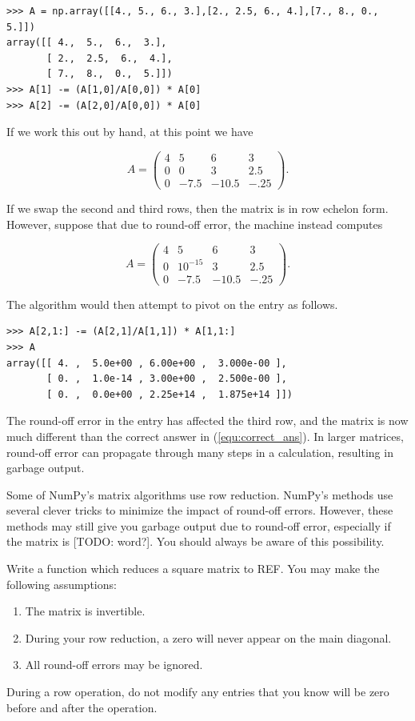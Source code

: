 \begin{lstlisting}
>>> A = np.array([[4., 5., 6., 3.],[2., 2.5, 6., 4.],[7., 8., 0., 5.]])
array([[ 4.,  5.,  6.,  3.],
       [ 2.,  2.5,  6.,  4.],
       [ 7.,  8.,  0.,  5.]])
>>> A[1] -= (A[1,0]/A[0,0]) * A[0]
>>> A[2] -= (A[2,0]/A[0,0]) * A[0]
\end{lstlisting}

If we work this out by hand, at this point we have

\begin{equation}\label{equ:correct_ans}
A = \begin{pmatrix}
4&5&6&3 \\
0&0&3&2.5 \\
0&-7.5&-10.5&-.25
\end{pmatrix}.
\end{equation}

If we swap the second and third rows, then the matrix is in row echelon form. However, suppose that due to round-off error, the machine instead computes

\[
A = \begin{pmatrix}
4&5&6&3 \\
0&10^{-15}&3&2.5 \\
0&-7.5&-10.5&-.25
\end{pmatrix}.
\]

The algorithm would then attempt to pivot on the  entry as follows.

\begin{lstlisting}
>>> A[2,1:] -= (A[2,1]/A[1,1]) * A[1,1:]
>>> A
array([[ 4. ,  5.0e+00 , 6.00e+00 ,  3.000e-00 ],
       [ 0. ,  1.0e-14 , 3.00e+00 ,  2.500e-00 ],
       [ 0. ,  0.0e+00 , 2.25e+14 ,  1.875e+14 ]])
\end{lstlisting}

The round-off error in the  entry has affected the third
row, and the matrix is now much different than the correct answer in (\ref{equ:correct_ans}). In larger matrices, round-off error can propagate through many steps in a calculation, resulting in garbage output.

Some of NumPy's matrix algorithms use row reduction. NumPy's methods use several clever tricks to minimize the impact of round-off errors. However, these methods may still give you garbage output due to round-off error, especially if the matrix is [TODO: word?]. You should always be aware of this possibility.

\begin{problem}
\label{prob:REF}
Write a function which reduces a square matrix to REF. You may make the following assumptions:
\begin{enumerate}
\item The matrix is invertible.
\item During your row reduction, a zero will never appear on the main diagonal.
\item All round-off errors may be ignored.
\end{enumerate}
During a row operation, do not modify any entries that you know will be zero before and after the operation.
\end{problem}


